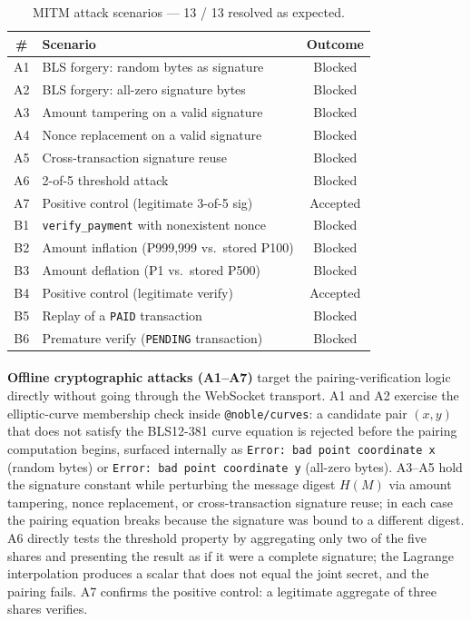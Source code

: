 \begin{table}[H]
  \centering
  \caption{MITM attack scenarios --- 13 / 13 resolved as expected.}
  \label{tab:mitm}
  \begin{tabular}{|c|l|c|}
    \hline
    \# & Scenario & Outcome \\\hline
    A1 & BLS forgery: random bytes as signature & Blocked \\\hline
    A2 & BLS forgery: all-zero signature bytes & Blocked \\\hline
    A3 & Amount tampering on a valid signature & Blocked \\\hline
    A4 & Nonce replacement on a valid signature & Blocked \\\hline
    A5 & Cross-transaction signature reuse & Blocked \\\hline
    A6 & 2-of-5 threshold attack & Blocked \\\hline
    A7 & Positive control (legitimate 3-of-5 sig) & Accepted \\\hline
    B1 & \texttt{verify\_payment} with nonexistent nonce & Blocked \\\hline
    B2 & Amount inflation (₱999{,}999 vs.\ stored ₱100) & Blocked \\\hline
    B3 & Amount deflation (₱1 vs.\ stored ₱500) & Blocked \\\hline
    B4 & Positive control (legitimate verify) & Accepted \\\hline
    B5 & Replay of a \texttt{PAID} transaction & Blocked \\\hline
    B6 & Premature verify (\texttt{PENDING} transaction) & Blocked \\\hline
  \end{tabular}
\end{table}

\paragraph{}\textbf{Offline cryptographic attacks (A1--A7)} target the pairing-verification logic directly without going through the WebSocket transport. A1 and A2 exercise the elliptic-curve membership check inside \texttt{@noble/curves}: a candidate pair $(x, y)$ that does not satisfy the BLS12-381 curve equation is rejected before the pairing computation begins, surfaced internally as \texttt{Error: bad point coordinate x} (random bytes) or \texttt{Error: bad point coordinate y} (all-zero bytes). A3--A5 hold the signature constant while perturbing the message digest $H(M)$ via amount tampering, nonce replacement, or cross-transaction signature reuse; in each case the pairing equation breaks because the signature was bound to a different digest. A6 directly tests the threshold property by aggregating only two of the five shares and presenting the result as if it were a complete signature; the Lagrange interpolation produces a scalar that does not equal the joint secret, and the pairing fails. A7 confirms the positive control: a legitimate aggregate of three shares verifies.

